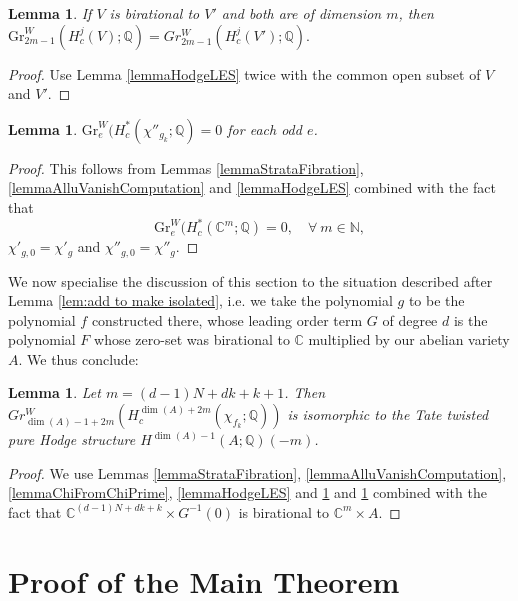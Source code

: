 \documentclass[11pt]{amsart}
\newtheorem{lemma}[thm]{Lemma}
\newcommand{\bQ}{\mathbb{Q}}
\newcommand{\bC}{\mathbb{C}}
\newcommand{\bN}{\mathbb{N}}
\numberwithin{equation}{section}
\newcommand{\Gr}{\mathrm{Gr}}
\begin{document}
\begin{lemma}\label{lemmaHodgeOfBirational}
	If $V$ is birational to $V'$ and both are of dimension $m$, then $\Gr^W_{2m-1}(H^j_c(V);\bQ) = Gr^W_{2m-1}(H^j_c(V');\bQ).$
\end{lemma}
\begin{proof}
	Use Lemma \ref{lemmaHodgeLES} twice with the common open subset of $V$ and $V'$.
\end{proof}


\begin{lemma} \label{lemmaOddWeightVanishing}
	$\Gr^W_e(H_c^*(\chi''_{g_k};\bQ)=0$ for each odd $e$.
\end{lemma}
\begin{proof}
	This follows from  Lemmas \ref{lemmaStrataFibration}, \ref{lemmaAlluVanishComputation} and \ref{lemmaHodgeLES} combined with the fact that \begin{equation}
		\Gr^W_e(H_c^*(\bC^m;\bQ)=0, \quad \forall \ m \in \bN,
	\end{equation}
	$\chi'_{g,0} = \chi'_g$ and $\chi''_{g,0} = \chi''_g$.
\end{proof}


We now specialise the discussion of this section to the situation described after Lemma \ref{lem:add to make isolated}, i.e. we take the polynomial $g$ to be the polynomial $f$ constructed there, whose leading order term $G$ of degree $d$ is the polynomial $F$ whose zero-set was birational to $\bC$ multiplied by our abelian variety $A$.  We thus conclude:

\begin{lemma} \label{lemmafkHodgeComputation}
	Let $m = (d-1)N+dk + k+1$.
	Then $Gr^W_{\dim(A)-1+2m}(H_c^{\dim(A)+2m}(\chi_{f_k};\bQ))$ is isomorphic to the Tate twisted pure Hodge structure $H^{\dim(A)-1}(A;\bQ)(-m)$.
\end{lemma}
\begin{proof}
	We use Lemmas \ref{lemmaStrataFibration}, \ref{lemmaAlluVanishComputation},
	\ref{lemmaChiFromChiPrime},
	\ref{lemmaHodgeLES} and \ref{lemmaHodgeOfBirational}
	and \ref{lemmaOddWeightVanishing}
	combined with the fact that $\bC^{(d-1)N+dk + k} \times G^{-1}(0)$ is birational to $\bC^m \times A$.
\end{proof}





\section{Proof of the Main Theorem}
\end{document}
